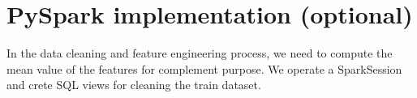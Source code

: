 \documentclass{article}
\begin{document}
\section{PySpark implementation (optional)}
In the data cleaning and feature engineering process, we need to compute the mean value of the features for complement purpose. We operate a SparkSession and crete SQL views for cleaning the train dataset.
\end{document}
